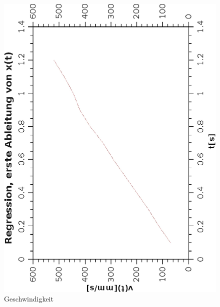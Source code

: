 \documentclass{article}
\begin{document}
\begin{figure}[H]
\caption{Geschwindigkeit}
\begin{center}
\includegraphics[scale=0.7,angle=-90]{RegressionGeschw.eps}
\end{center}
\end{figure}
\end{document}
